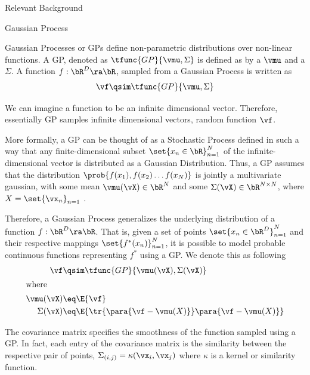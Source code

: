 \documentclass{article}
\begin{document}
\begin{psection}{Relevant Background}

\begin{psubsection}{Gaussian Process}

	Gaussian Processes or GPs define non-parametric distributions over non-linear functions.
	A GP, denoted as $\tfunc{GP}{\vmu, \Sigma}$ is defined as by a  $\vmu$ and a  $\Sigma$. A function $f : \bR^D \ra \bR$, sampled from a Gaussian Process is written as
	\begin{align*}
		\vf	\qsim	\tfunc{GP}{\vmu, \Sigma}
	\end{align*}

	We can imagine a function to be an infinite dimensional vector. Therefore, essentially GP samples infinite dimensional vectors, \ie random function $\vf$.

	More formally, a GP can be thought of as a Stochastic Process defined in such a way that any finite-dimensional subset $\set{x_n \in \bR}_{n = 1}^N$ of the infinite-dimensional vector is distributed as a Gaussian Distribution. Thus, a GP assumes that the distribution $\prob{f(x_1), f(x_2) \dots f(x_N)}$ is jointly a multivariate gaussian, with some mean $\vmu(\vX) \in \bR^N$ and some $\Sigma(\vX) \in \bR^{N \times N}$, where $X = \set{\vx_n}_{n = 1}$ \citep{murphy}.


	Therefore, a Gaussian Process generalizes the underlying distribution of a function $f : \bR^D \ra \bR$. That is, given a set of points $\set{x_n \in \bR^D}_{n = 1}^N$ and their respective mappings $\set{f^\ast{(x_n)}}_{n = 1}^N$, it is possible to model probable continuous functions representing $f^\ast$ using a GP. We denote this as following
	\begin{align*}
		\vf			&\qsim	\tfunc{GP}{\vmu(\vX), \Sigma(\vX)} \\
	\intertext{where}
		\vmu(\vX)	&\eq	\E{\vf} \\
		\Sigma(\vX)	&\eq	\E{\tr{\para{\vf - \vmu(X)}} \para{\vf - \vmu(X)}}
	\end{align*}

	The covariance matrix specifies the smoothness of the function sampled using a GP.
	In fact, each entry of the covariance matrix is the similarity between the respective pair of points, \ie $\Sigma_{(i, j)} = \kappa(\vx_i, \vx_j)$ where $\kappa$ is a kernel \citep[see][]{kernel} or similarity function.


\end{psubsection}
\end{psection}
\end{document}

